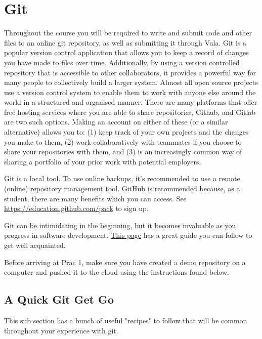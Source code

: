 \section{Git}
\label{sec:Git}
Throughout the course you will be required to write and submit code and other files to an online git repository, as well as submitting it through Vula.  Git is a popular version control application that allows you to keep a record of changes you have made to files over time.  Additionally, by using a version controlled repository that is accessible to other collaborators, it provides a powerful way for many people to collectively build a larger system.  Almost all open source projects use a version control system to enable them to work with anyone else around the world in a structured and organised manner.  There are many platforms that offer free hosting services where you are able to share repositories, Github, and Gitlab are two such options.  Making an account on either of these (or a similar alternative) allows you to: (1) keep track of your own projects and the changes you make to them, (2) work collaboratively with teammates if you choose to share your repositories with them, and (3) is an increasingly common way of sharing a portfolio of your prior work with potential employers.

Git is a local tool. To use online backups, it's recommended to use a remote (online) repository management tool. GitHub is recommended because, as a student, there are many benefits which you can access. See \href{https://education.github.com/pack}{https://education.github.com/pack} to sign up.

Git can be intimidating in the beginning, but it becomes invaluable as you progress in software development. \href{https://swcarpentry.github.io/git-novice/}{This page} has a great guide you can follow to get well acquainted.

Before arriving at Prac 1, make sure you have created a demo repository on a computer and pushed it to the cloud using the instructions found below.

\subsection{A Quick Git Get Go}
This sub section has a bunch of useful "recipes" to follow that will be common throughout your experience with git.

